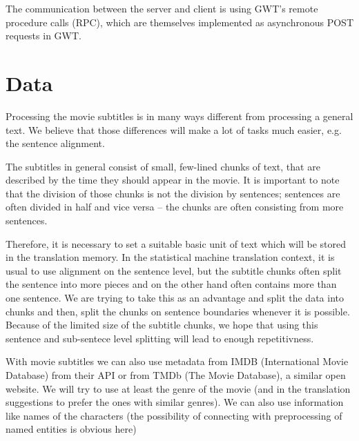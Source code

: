 The communication between the server and client is using GWT's remote procedure calls (RPC), which are themselves implemented as asynchronous POST requests in GWT.

\section{Data}

Processing the movie subtitles is in many ways different from processing a general text. We believe that those differences will make a lot of tasks much easier, e.g. the sentence alignment.


The subtitles in general consist of small, few-lined chunks of text, that are described by the time they should appear in the movie. It is important to note that the division of those chunks is not the division by sentences; sentences are often divided in half and vice versa -- the chunks are often consisting from more sentences.    

Therefore, it is necessary to set a suitable basic unit of text which will be stored in the translation memory. In the statistical machine translation context, it is usual to use alignment on the sentence level, but the subtitle chunks often split the sentence into more pieces and on the other hand often contains more than one sentence. 
We are trying to take this as an advantage and split the data into chunks and then, split the chunks on  sentence boundaries whenever it is possible. Because of the limited size of the subtitle chunks, we hope that using this sentence and sub-sentece level splitting will lead to enough repetitivness.


With movie subtitles we can also use metadata from IMDB (International Movie Database) from their API or from TMDb (The Movie Database), a similar open website. We will try to use at least the genre of the movie (and in the translation suggestions to prefer the ones with similar genres). We can also use information like names of the characters (the possibility of connecting with preprocessing of named entities is obvious here)

